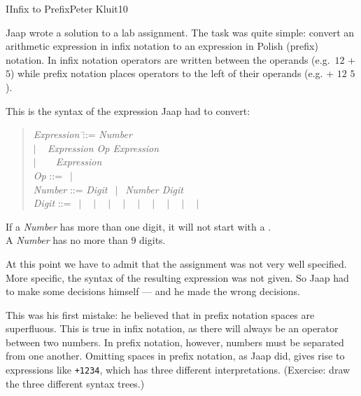 \begin{icpcproblem}{I}{Infix to Prefix}{Peter Kluit}{10}

Jaap wrote a solution to a lab assignment. The task was quite simple: convert an arithmetic expression in infix notation to an expression in Polish (prefix) notation. In infix notation operators are written between the operands (e.g.~$12$ + $5$) while prefix notation places operators to the left of their operands (e.g. + $12$ $5$).

This is the syntax of the expression Jaap had to convert:
\begin{quote}
\begin{tabbing}	
\emph{Expression} \= ::= \= \emph{Number}\\
       \> \enskip $\mid$ \> \typeword{(}~ \emph{Expression Op Expression} ~\typeword{)} \\
       \> \enskip $\mid$ \> \typeword{(}~ \typeword{-}~ \emph{Expression} ~\typeword{)} \\
\emph{Op}         \> ::= \> \typeword{+} $\,\mid\,$ \typeword{-} \\
\emph{Number}     \> ::= \> \emph{Digit} $\,\mid\,$ \emph{Number Digit}\\
\emph{Digit}      \> ::= \>  $\,\mid\,$  $\,\mid\,$  $\,\mid\,$  $\,\mid\,$  $\,\mid\,$  $\,\mid\,$  $\,\mid\,$  $\,\mid\,$  $\,\mid\,$ 
\end{tabbing}
\end{quote}

If a \emph{Number} has more than one digit, it will not start with a . \\
A \emph{Number} has no more than $9$ digits.

At this point we have to admit that the assignment was not very well specified. More specific, the syntax of the resulting expression was not given. So Jaap had to make some decisions himself --- and he made the wrong decisions.  

This was his first mistake: he believed that in prefix notation spaces are superfluous.
This is true in infix notation, as there will always be an operator between two numbers.
In prefix notation, however, numbers must be separated from one another. Omitting spaces in prefix notation, as Jaap did,  gives rise to expressions like \texttt{+1234}, which has three different interpretations. (Exercise: draw the three different syntax trees.)


\end{icpcproblem}
